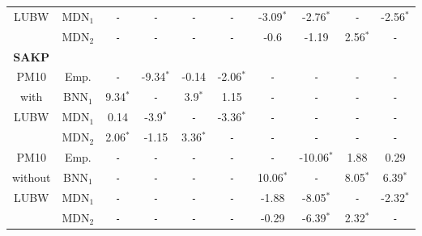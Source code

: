 \begin{tabular}{c|c|cccc||cccc}
  LUBW&MDN$_1$&\texttt{\--}&\texttt{\--}&\texttt{\--}&\texttt{\--}&-3.09$^*$&-2.76$^*$&\texttt{\--}&-2.56$^*$ \\ 
  &MDN$_2$&\texttt{\--}&\texttt{\--}&\texttt{\--}&\texttt{\--}&-0.6&-1.19&2.56$^*$&\texttt{\--} \\ 
  \hline     
  \hline     
\textbf{SAKP}&&&&&&& \\ 
  PM10&Emp.&\texttt{\--}&-9.34$^*$&-0.14&-2.06$^*$&\texttt{\--}&\texttt{\--}&\texttt{\--}&\texttt{\--} \\ 
  with&BNN$_1$&9.34$^*$&\texttt{\--}&3.9$^*$&1.15&\texttt{\--}&\texttt{\--}&\texttt{\--}&\texttt{\--} \\ 
  LUBW&MDN$_1$&0.14&-3.9$^*$&\texttt{\--}&-3.36$^*$&\texttt{\--}&\texttt{\--}&\texttt{\--}&\texttt{\--} \\ 
  &MDN$_2$&2.06$^*$&-1.15&3.36$^*$&\texttt{\--}&\texttt{\--}&\texttt{\--}&\texttt{\--}&\texttt{\--} \\ 
  \hline     
  PM10&Emp.&\texttt{\--}&\texttt{\--}&\texttt{\--}&\texttt{\--}&\texttt{\--}&-10.06$^*$&1.88&0.29 \\ 
  without&BNN$_1$&\texttt{\--}&\texttt{\--}&\texttt{\--}&\texttt{\--}&10.06$^*$&\texttt{\--}&8.05$^*$&6.39$^*$ \\ 
  LUBW&MDN$_1$&\texttt{\--}&\texttt{\--}&\texttt{\--}&\texttt{\--}&-1.88&-8.05$^*$&\texttt{\--}&-2.32$^*$ \\ 
  &MDN$_2$&\texttt{\--}&\texttt{\--}&\texttt{\--}&\texttt{\--}&-0.29&-6.39$^*$&2.32$^*$&\texttt{\--} \\ 
  \hline     
  \hline     
\end{tabular} 
